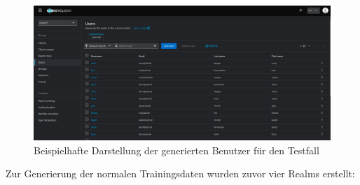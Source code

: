 \documentclass[a4paper,12pt]{article}
\begin{document}
	\begin{figure}[H]
		\centering
		\includegraphics[scale=1.5, width=\linewidth]{Bilder/screenshot011}
		\caption{Beispielhafte Darstellung der generierten Benutzer für den Testfall}
		\label{fig:screenshot011}
	\end{figure}
	Zur Generierung der normalen Trainingsdaten wurden zuvor vier Realms erstellt:
	
\end{document}
